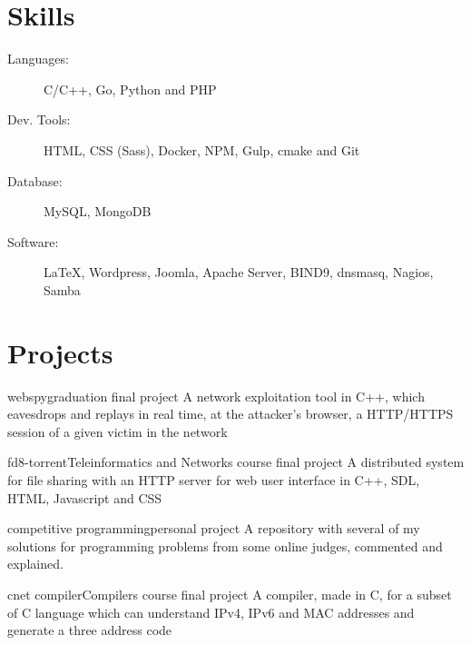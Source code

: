 \documentclass{cv}
\begin{document}
  \section{Skills}
  \begin{description}
    \item[Languages:] C/C++, Go, Python and PHP
    \item[Dev. Tools:] HTML, CSS (Sass), Docker, NPM, Gulp, cmake and Git
    \item[Database:] MySQL, MongoDB
    \item[Software:] \LaTeX, Wordpress, Joomla, Apache Server, BIND9, dnsmasq, Nagios, Samba
  \end{description}

  \section{Projects}
  \begin{chronoitem}{webspy}{graduation final project}{}
    A network exploitation tool in C++, which eavesdrops and replays in real time, at the attacker's browser, a HTTP/HTTPS session of a given victim in the network
  \end{chronoitem}

  \begin{chronoitem}{fd8-torrent}{Teleinformatics and Networks course final project}{}
    A distributed system for file sharing with an HTTP server for web user interface in C++, SDL, HTML, Javascript and CSS
  \end{chronoitem}

  \begin{chronoitem}{competitive programming}{personal project}{}
    A repository with several of my solutions for programming problems from some online judges, commented and explained.
  \end{chronoitem}

  \begin{chronoitem}{cnet compiler}{Compilers course final project}{}
    A compiler, made in C, for a subset of C language which can understand IPv4, IPv6 and MAC addresses and generate a three address code
  \end{chronoitem}
\end{document}
